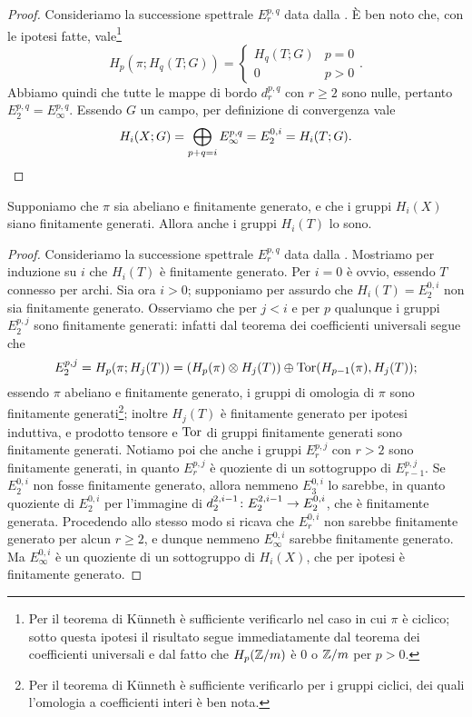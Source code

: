 \begin{proof}
Consideriamo la successione spettrale $E^{p,q}_r$ data dalla . È ben noto che, con le ipotesi fatte, vale\footnote{Per il teorema di Künneth è sufficiente verificarlo nel caso in cui $\pi$ è ciclico; sotto questa ipotesi il risultato segue immediatamente dal teorema dei coefficienti universali e dal fatto che $H_p(\mathbb{Z}/m)$ è $0$ o $\mathbb{Z}/m$ per $p>0$.}
$$
H_p(\pi;H_q(T;G))=
\begin{cases}
H_q(T;G)&p=0\\
0&p>0
\end{cases}.
$$
Abbiamo quindi che tutte le mappe di bordo $d^{p,q}_r$ con $r\ge 2$ sono nulle, pertanto $E^{p,q}_2=E^{p,q}_\infty$. Essendo $G$ un campo, per definizione di convergenza vale
\[
H_i(X;G)=\bigoplus_{p+q=i}E^{p,q}_\infty=E^{0,i}_2=H_i(T;G).\qedhere
\]
\end{proof}

\begin{proposition}
Supponiamo che $\pi$ sia abeliano e finitamente generato, e che i gruppi $H_i(X)$ siano finitamente generati. Allora anche i gruppi $H_i(T)$ lo sono.
\end{proposition}
\begin{proof}
Consideriamo la successione spettrale $E^{p,q}_r$ data dalla . Mostriamo per induzione su $i$ che $H_i(T)$ è finitamente generato. Per $i=0$ è ovvio, essendo $T$ connesso per archi. Sia ora $i>0$; supponiamo per assurdo che $H_i(T)=E^{0,i}_2$ non sia finitamente generato. Osserviamo che per $j<i$ e per $p$ qualunque i gruppi $E^{p,j}_2$ sono finitamente generati: infatti dal teorema dei coefficienti universali segue che
$$
E^{p,j}_2=H_p(\pi;H_j(T))=(H_p(\pi)\mathbin{\otimes} H_j(T))\mathbin{\oplus}\operatorname{Tor}(H_{p-1}(\pi),H_j(T));
$$
essendo $\pi$ abeliano e finitamente generato, i gruppi di omologia di $\pi$ sono finitamente generati\footnote{Per il teorema di Künneth è sufficiente verificarlo per i gruppi ciclici, dei quali l'omologia a coefficienti interi è ben nota.}; inoltre $H_j(T)$ è finitamente generato per ipotesi induttiva, e prodotto tensore e $\operatorname{Tor}$ di gruppi finitamente generati sono finitamente generati. Notiamo poi che anche i gruppi $E^{p,j}_r$ con $r>2$ sono finitamente generati, in quanto $E^{p,j}_r$ è quoziente di un sottogruppo di $E^{p,j}_{r-1}$. Se $E^{0,i}_2$ non fosse finitamente generato, allora nemmeno $E^{0,i}_3$ lo sarebbe, in quanto quoziente di $E^{0,i}_2$ per l'immagine di $\map{d^{2,i-1}_2}{E^{2,i-1}_2}{E^{0,i}_2}$, che è finitamente generata. Procedendo allo stesso modo si ricava che $E^{0,i}_r$ non sarebbe finitamente generato per alcun $r\ge 2$, e dunque nemmeno $E^{0,i}_\infty$ sarebbe finitamente generato. Ma $E^{0,i}_\infty$ è un quoziente di un sottogruppo di $H_i(X)$, che per ipotesi è finitamente generato.
\end{proof}